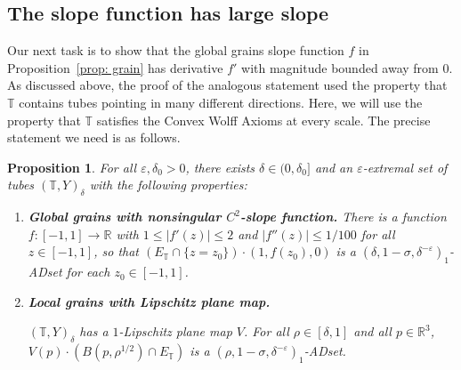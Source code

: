 \documentclass[letterpaper, reqno,11pt]{article}
\numberwithin{equation}{section}
\newcommand{\TT}{\mathbb{T}}
\newcommand{\eps}{\varepsilon}
\newcommand{\tubes}{\mathbb{T}}
\numberwithin{thm}{section}
\newtheorem{prop}[thm]{Proposition}
\theoremstyle{remark}
\begin{document}
\subsection{The slope function has large slope}\label{largeSlopeSection}
Our next task is to show that the global grains slope function $f$ in Proposition~\ref{prop: grain} has derivative $f'$ with magnitude bounded away from 0. As discussed above, the proof of the analogous statement \cite[Proposition 6.1]{WZ} used the property that $\tubes$ contains tubes pointing in many different directions. Here, we will use the property that $\tubes$ satisfies the Convex Wolff Axioms at every scale. The precise statement we need is as follows. 

\begin{prop}\label{prop: large slope}
    For all $\eps, \delta_0>0$, there exists $\delta\in (0, \delta_0]$ and an $\eps$-extremal set of tubes $(\TT, Y)_{\delta}$ with the following properties: 
    \begin{enumerate}
         \item[1$''$]
         \textbf{Global grains with nonsingular $C^2$-slope function.}
         There is a function $f: [-1,1]\rightarrow \mathbb{R}$ with $1\leq |f'(z)|\leq 2$ and $|f''(z)|\leq 1/100$ for all $z\in [-1,1]$,  so that $(E_{\TT} \cap \{z=z_0\})\cdot (1, f(z_0), 0)$ is a $(\delta, 1-\sigma, \delta^{-\eps})_1$-ADset for each $z_0 \in [-1,1]$. 
         
         
         \item[2] \textbf{ Local grains with Lipschitz plane map. }

    $(\TT, Y)_{\delta}$ has a $1$-Lipschitz plane map $V$. For all $\rho\in [\delta, 1]$ and all $p\in \mathbb{R}^3$, $V(p)\cdot (B(p, \rho^{1/2})\cap E_{\TT})$ is a $(\rho, 1-\sigma, \delta^{-\eps})_1$-ADset. 
    \end{enumerate}
\end{prop}
\end{document}
